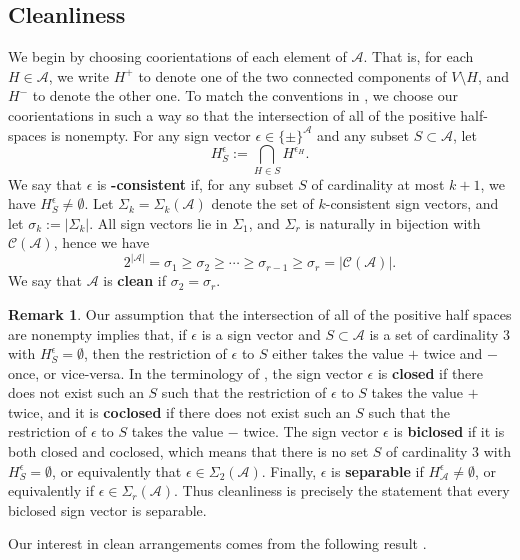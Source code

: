 \documentclass[11pt]{article}
\theoremstyle{definition}
\newtheorem{remark}[theorem]{Remark}
\newcommand{\eps}{\epsilon}
\newcommand{\<}{\left<}
\renewcommand{\>}{\right>}
\newcommand{\cA}{\mathcal{A}}
\newcommand{\cC}{\mathcal{C}}
\newcommand{\cS}{S}
\newcommand{\abs}[1]{\left|#1\right|}               %
\begin{document}
\subsection{Cleanliness}
We begin by choosing coorientations of each element of $\cA$.  That is, for each $H\in\cA$, we write $H^+$ to denote 
one of the two connected components of $V\setminus H$, and $H^-$ to denote the other one.
To match the conventions in \cite{Barkley-Speyer}, we choose our coorientations in such a way so that the intersection of
all of the positive half-spaces is nonempty.
For any sign vector $\eps\in\{\pm\}^\cA$ and any subset $\cS\subset\cA$, let
\[
H_\cS^\eps := \bigcap_{H\in\cS}H^{\eps_H}.
\]
We say that $\eps$ is {\bf {}-consistent} if, for any subset $\cS$ of cardinality at most $k+1$, we have $H_\cS^\eps\neq\emptyset$.
Let $\Sigma_k = \Sigma_k(\cA)$ denote the set of $k$-consistent sign vectors, and let $\sigma_k := \abs{\Sigma_k}$.  
All sign vectors lie in $\Sigma_1$, and $\Sigma_r$ is naturally in bijection with $\cC(\cA)$, hence we have
\[
2^{\abs{\cA}} = \sigma_1 \geq \sigma_2 \geq \cdots \geq \sigma_{r - 1} \geq  \sigma_{r} = \abs{\cC(\cA)}.
\]
We say that $\cA$ is {\bf clean} if $\sigma_2 = \sigma_r$.

\begin{remark}
Our assumption that the intersection of all of the positive half spaces are nonempty implies that, if $\eps$ is a sign vector and
$S\subset\cA$ is a set of cardinality 3 with $H_S^\eps=\emptyset$, then the restriction of $\eps$ to $S$ 
either takes the value $+$ twice and $-$ once, or vice-versa.
In the terminology of \cite[Section 2.1]{Barkley-Speyer}, the sign vector $\eps$ is {\bf closed} if there does not exist 
such an $S$ such that the restriction of $\eps$ to $S$ takes the value $+$ twice, and it is {\bf coclosed} if there does not exist 
such an $S$ such that the restriction of $\eps$ to $S$ takes the value $-$ twice.
The sign vector $\eps$ is {\bf biclosed} if it is both closed and coclosed, which means that there is no set $S$ of cardinality 3 with $H_S^\eps=\emptyset$,
or equivalently that $\eps\in\Sigma_2(\cA)$.
Finally, $\eps$ is {\bf separable} if $H_{\!\cA}^\eps\neq\emptyset$, or equivalently if $\eps\in\Sigma_r(\cA)$.  Thus cleanliness is precisely the statement that every biclosed sign
vector is separable.
\end{remark}

Our interest in clean arrangements comes from the following result \cite[Theorem 5.1(2)]{yoshinaga-spheres}.
\end{document}
